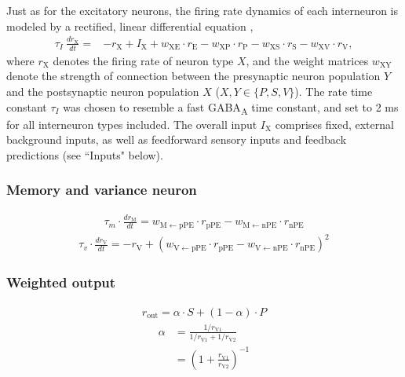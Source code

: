 \documentclass[10pt,a4paper,draft]{article}
\begin{document}
Just as for the excitatory neurons, the firing rate dynamics of each interneuron is modeled by a rectified, linear differential equation \citep{wilson1972excitatory},
%
\begin{align}
\label{eq:RateEqINs}
\tau_I\ \frac{dr_\mathrm{X}}{dt} =& - r_\mathrm{X} + I_{\mathrm{X}} + w_\mathrm{XE}\cdot r_\mathrm{E} - w_\mathrm{XP}\cdot r_\mathrm{P}  - w_\mathrm{XS}\cdot r_\mathrm{S} -  w_\mathrm{XV}\cdot r_\mathrm{V}, 
\end{align}
%
where $r_\mathrm{X}$ denotes the firing rate of neuron type $X$, and the weight matrices $w_\mathrm{XY}$ denote the strength of connection between the presynaptic neuron population $Y$ and the postsynaptic neuron population $X$ ($X, Y\in \lbrace P,S,V\rbrace$). The rate time constant $\tau_I$ was chosen to resemble a fast GABA\textsubscript{A} time constant, and set to 2 ms for all interneuron types included. The overall input $I_\mathrm{X}$ comprises fixed, external background inputs, as well as feedforward sensory inputs and feedback predictions (see ``Inputs" below).

\subsubsection*{Memory and variance neuron}
%
\begin{align}
\tau_m \cdot \frac{dr_\mathrm{M}}{dt} = w_\mathrm{M\leftarrow pPE} \cdot r_\mathrm{pPE} - w_\mathrm{M\leftarrow nPE} \cdot r_\mathrm{nPE} 
\end{align}
%
\begin{align}
\tau_v \cdot \frac{dr_\mathrm{V}}{dt} = -r_\mathrm{V} + (w_\mathrm{V\leftarrow pPE} \cdot r_\mathrm{pPE} - w_\mathrm{V\leftarrow nPE} \cdot r_\mathrm{nPE})^2 
\end{align}

\subsubsection*{Weighted output}
%
\begin{align}
r_\mathrm{out} = \alpha \cdot S + (1-\alpha) \cdot P
\end{align}
%
\begin{align}
\alpha &= \frac{1/r_\mathrm{V1}}{1/r_\mathrm{V1} + 1/r_\mathrm{V2}}\nonumber\\
& = \left( 1 + \frac{r_\mathrm{V1}}{r_\mathrm{V2}} \right)^{-1}
\end{align}
\end{document}

